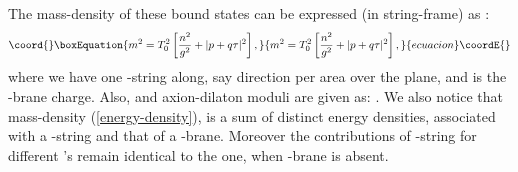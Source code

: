 \documentclass[a4paper,12pt]{article}
\begin{document}
The mass-density of these \coordHE{} bound states can be 
expressed (in string-frame) as \cite{myers,lu2,cai}:
\begin{equation}\coord{}\boxEquation{
m^2 = T_0^2\left[{n^2\over g^2} + |p + q \tau|^2 \right], 
\label{energy-density}
}{
m^2 = T_0^2\left[{n^2\over g^2} + |p + q \tau|^2 \right], 
}{ecuacion}\coordE{}\end{equation}
where we have one \coordHE{}-string along, say \coordHE{} direction
per \coordHE{} area \cite{lu1} over the \coordHE{} plane,
and \coordHE{} is the  \coordHE{}-brane charge. 
Also, \coordHE{} and 
axion-dilaton moduli are given as: 
\coordHE{}. We also notice that mass-density
(\ref {energy-density}), is a sum of distinct energy densities,
associated with a \coordHE{}-string and that of a \coordHE{}-brane. Moreover
the contributions of \coordHE{}-string for different \coordHE{}'s
remain identical to the one, when \coordHE{}-brane is absent. 
\end{document}
